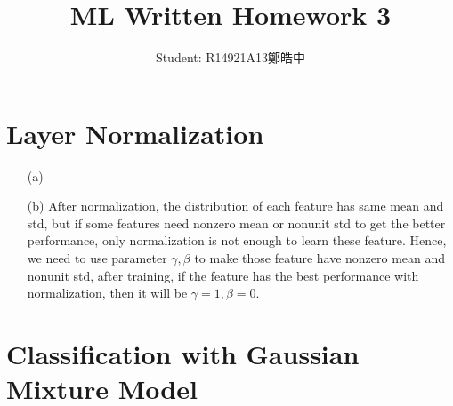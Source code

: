 \documentclass[12pt,a4paper]{article}
\title{ML Written Homework 3}
\author{Student: R14921A13鄭皓中}
\begin{document}
\maketitle

\section{Layer Normalization}

\begin{enumerate}
    \item [(a)] 
        
    \item[(b)]
        After normalization, the distribution of each feature has same mean and std, but if some features need nonzero mean or nonunit std to get the better performance, only normalization is not enough to learn these feature.
        Hence, we need to use parameter $\gamma, \beta$ to make those feature have nonzero mean and nonunit std, after training, if the feature has the best performance with normalization, then it will be $\gamma=1, \beta=0$.
\end{enumerate}

\section{Classification with Gaussian Mixture Model}    
\end{document}
